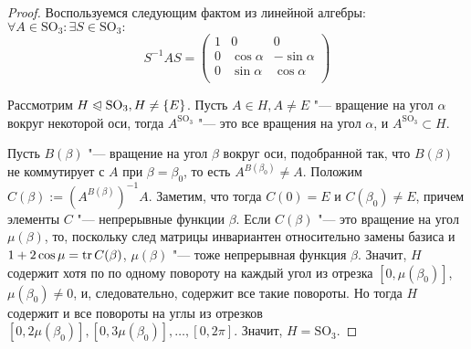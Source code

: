 \begin{proof}
	Воспользуемся следующим фактом из линейной алгебры: $\forall A \in \mathrm{SO}_3: \exists S \in \mathrm{SO_3}:$
	\[S^{-1}AS = \begin{pmatrix}
		1 & 0 & 0 \\
		0 & \cos\alpha & -\sin\alpha\\
		0 & \sin\alpha & \cos\alpha\\
	\end{pmatrix}\]
	
	Рассмотрим $H \trianglelefteqslant \mathrm{SO}_3, H \ne \{E\}$. Пусть $A \in H, A \ne E$ "--- вращение на угол $\alpha$ вокруг некоторой оси, тогда $A^{\mathrm{SO}_3}$ "--- это все вращения на угол $\alpha$, и $A^{\mathrm{SO}_3} \subset H$.
	
	Пусть $B(\beta)$ "--- вращение на угол $\beta$ вокруг оси, подобранной так, что $B(\beta)$ не коммутирует с $A$ при $\beta = \beta_0$, то есть $A^{B(\beta_0)} \ne A$. Положим $C(\beta) := (A^{B(\beta)})^{-1}A$. Заметим, что тогда $C(0) = E$ и $C(\beta_0) \ne E$, причем элементы $C$ "--- непрерывные функции $\beta$. Если $C(\beta)$ "--- это вращение на угол $\mu(\beta)$, то, поскольку след матрицы инвариантен относительно замены базиса и $1 + 2\cos\mu = \operatorname{tr} C(\beta)$, $\mu(\beta)$ "--- тоже непрерывная функция $\beta$. Значит, $H$ содержит хотя по по одному повороту на каждый угол из отрезка $[0, \mu(\beta_0)]$, $\mu(\beta_0) \ne 0$, и, следовательно, содержит все такие повороты. Но тогда $H$ содержит и все повороты на углы из отрезков $[0, 2\mu(\beta_0)], [0, 3\mu(\beta_0)], \dotsc, [0, 2\pi]$. Значит, $H = \mathrm{SO}_3$.
\end{proof}